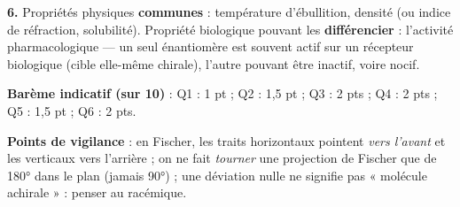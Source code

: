 \documentclass[11pt]{article}
\begin{document}
\begin{corrige}
\textbf{6.} Propriétés physiques \textbf{communes} : température d'ébullition, densité (ou indice de réfraction, solubilité). Propriété biologique pouvant les \textbf{différencier} : l'activité pharmacologique — un seul énantiomère est souvent actif sur un récepteur biologique (cible elle-même chirale), l'autre pouvant être inactif, voire nocif.

\textbf{Barème indicatif (sur 10)} : Q1 : 1 pt ; Q2 : 1,5 pt ; Q3 : 2 pts ; Q4 : 2 pts ; Q5 : 1,5 pt ; Q6 : 2 pts.

\textbf{Points de vigilance} : en Fischer, les traits horizontaux pointent \emph{vers l'avant} et les verticaux vers l'arrière ; on ne fait \emph{tourner} une projection de Fischer que de \ang{180} dans le plan (jamais \ang{90}) ; une déviation nulle ne signifie pas « molécule achirale » : penser au racémique.
\end{corrige}
\end{document}
